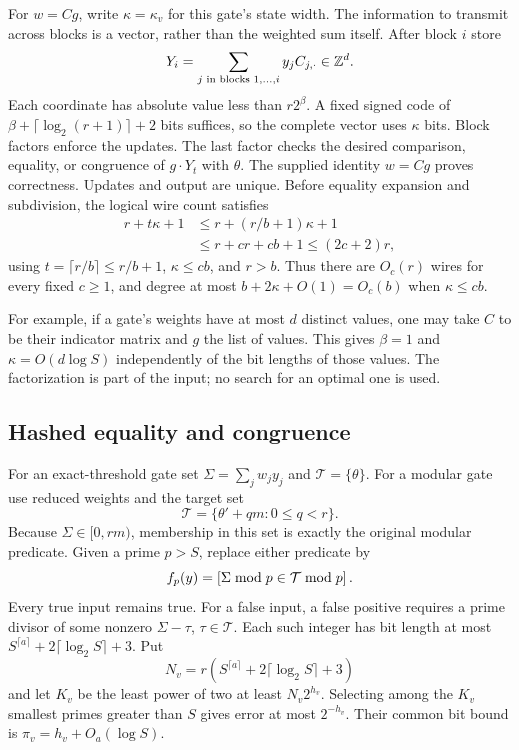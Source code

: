 For $w=Cg$, write $\kappa=\kappa_v$ for this gate's state width.
The information to transmit across blocks is a vector,
rather than the weighted sum itself. After block $i$ store
\[
 Y_i=\sum_{j\text{ in blocks }1,\ldots,i}y_jC_{j,\cdot}\in\mathbb Z^d.
\]
Each coordinate has absolute value less than $r2^\beta$. A fixed
signed code of $\beta+\lceil\log_2(r+1)\rceil+2$ bits suffices, so
the complete vector uses $\kappa$ bits. Block factors enforce the
updates. The last factor checks the desired comparison, equality,
or congruence of $g\cdot Y_t$ with $\theta$. The supplied identity
$w=Cg$ proves correctness. Updates and output are unique. Before
equality expansion and subdivision, the logical wire count satisfies
\begin{align*}
 r+t\kappa+1
 &\le r+(r/b+1)\kappa+1\\
 &\le r+cr+cb+1\le(2c+2)r,
\end{align*}
using $t=\lceil r/b\rceil\le r/b+1$, $\kappa\le cb$, and $r>b$.
Thus there are $O_c(r)$ wires for every fixed $c\ge1$, and degree at most
$b+2\kappa+O(1)=O_c(b)$ when $\kappa\le cb$.

For example, if a gate's weights have at most $d$ distinct values,
one may take $C$ to be their indicator matrix and $g$ the list of
values. This gives $\beta=1$ and $\kappa=O(d\log S)$ independently
of the bit lengths of those values. The factorization is part of the
input; no search for an optimal one is used.

\subsection{Hashed equality and congruence}

For an exact-threshold gate set
$\Sigma=\sum_jw_jy_j$ and $\mathcal T=\{\theta\}$. For a modular
gate use reduced weights and the target set
\[
 \mathcal T=\{\theta'+qm:0\le q<r\}.
\]
Because $\Sigma\in[0,rm)$, membership in this set is exactly the
original modular predicate. Given a prime $p>S$, replace either
predicate by
\[
 f_p(y)=\left[\Sigma\bmod p\in\mathcal T\bmod p\right].
\]
Every true input remains true. For a false input, a false positive
requires a prime divisor of some nonzero $\Sigma-\tau$,
$\tau\in\mathcal T$. Each such integer has bit length at most
$S^{\lceil a\rceil}+2\lceil\log_2S\rceil+3$. Put
\[
 N_v=r(S^{\lceil a\rceil}+2\lceil\log_2S\rceil+3)
\]
and let $K_v$ be the least power of two at least $N_v2^{h_v}$.
Selecting among the $K_v$ smallest primes greater than $S$ gives error
at most $2^{-h_v}$. Their common bit bound is
$\pi_v=h_v+O_a(\log S)$.

